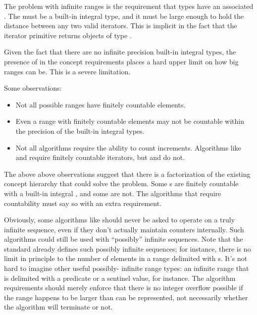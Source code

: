 \pnum
The problem with infinite ranges is the requirement that  types have an
associated . The  must be a built-in integral type, and
it must be large enough to hold the distance between any two valid iterators. This is implicit in
the fact that the  iterator primitive returns objects of type
.

\pnum
Given the fact that there are no infinite precision built-in integral types, the presence of
 in the concept requirements places a hard upper limit on how big ranges can
be. This is a severe limitation.

\pnum
Some observations:

\begin{itemize}
\item Not all possible ranges have finitely countable elements.
\item Even a range with finitely countable elements may not be countable within the precision of the
built-in integral types.
\item Not all algorithms require the ability to count increments. Algorithms like 
and  require finitely countable iterators, but  and  do
not.
\end{itemize}

\pnum
The above above observations suggest that there is a factorization of the existing concept hierarchy
that could solve the problem. Some s are finitely countable with a built-in
integral , and some are not. The algorithms that require countability must
say so with an extra requirement.

\pnum
Obviously, some algorithms like  should never be asked to operate on a truly
infinite sequence, even if they don't actually maintain counters internally. Such algorithms could
still be used with ``possibly'' infinite sequences. Note that the standard already defines such
possibly infinite sequences; for instance, there is no limit in principle to the number of elements
in a range delimited with s. It's not hard to imagine other useful possibly-
infinite range types: an infinite range that is delimited with a predicate or a sentinel value, for
instance. The algorithm requirements should merely enforce that there is no integer overflow
possible if the range happens to be larger than can be represented, not necessarily whether the
algorithm will terminate or not.

